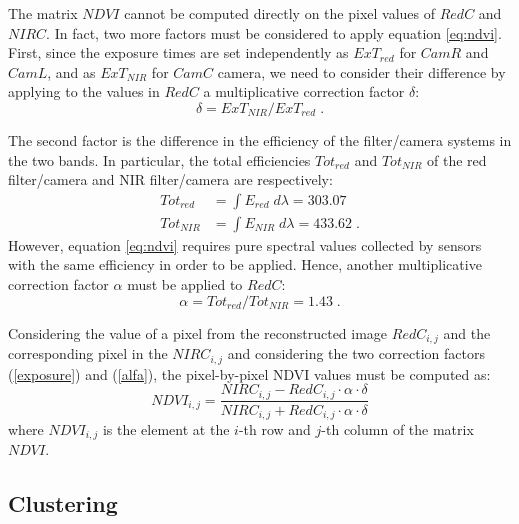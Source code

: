 \documentclass[letterpaper, 10pt, conference]{ieeeconf}      %
\begin{document}
The matrix $NDVI$ cannot be computed directly on the pixel values of $RedC$ and $NIRC$.
In fact, two more factors must be considered to apply equation \eqref{eq:ndvi}.
First, since the exposure times are set independently as $ExT_{red}$ for $CamR$ and $CamL$,  and as $ExT_{NIR}$ for $CamC$ camera, we need to consider their difference by applying to the values in $RedC$ a multiplicative correction factor $\delta$:
%
\begin{equation} \label{exposure}
\delta={ExT_{NIR}}/{ExT_{red}}\;.
\end{equation}

The second factor is the difference in the efficiency of the filter/camera systems in the two bands.
In particular, the total efficiencies $Tot_{red}$ and $Tot_{NIR}$ of the red filter/camera and NIR filter/camera are respectively:
%
\begin{eqnarray}  \label{integral}
Tot_{red} &=  \int E_{red}\; d\lambda =303.07\nonumber\\
Tot_{NIR} &=  \int E_{NIR}\; d\lambda=433.62 \;.
\end{eqnarray}
%
However, equation \eqref{eq:ndvi} requires pure spectral values collected by sensors with the same efficiency in order to be applied.
Hence, another multiplicative correction factor $\alpha$ must be applied to $RedC$:
%
\begin{equation}\label{alfa}
\alpha={Tot_{red}}/{Tot_{NIR}}=1.43 \;.
\end{equation}

Considering the value of a pixel from the reconstructed image ${RedC}_{i,j}$  and the corresponding  pixel in the  ${NIRC}_{i,j}$ and considering the two correction factors (\ref{exposure}) and (\ref{alfa}), the pixel-by-pixel NDVI values must be computed as:
%
\begin{equation} \label{eq:ndvi_new}
NDVI_{i,j}=\frac{NIRC_{i,j}-RedC_{i,j}\cdot \alpha \cdot \delta}{NIRC_{i,j}+RedC_{i,j}\cdot \alpha\cdot \delta}
\end{equation}
where $NDVI_{i,j}$ is the element at the $i$-th row and $j$-th column of the matrix $NDVI$.

\subsection{Clustering}\label{sec:clustering}
\end{document}
